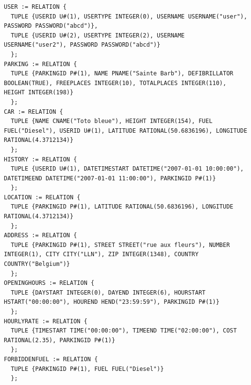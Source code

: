 \documentclass[a4paper,11pt]{article}
\begin{document}
\begin{lstlisting}
USER := RELATION {
  TUPLE {USERID U#(1), USERTYPE INTEGER(0), USERNAME USERNAME("user"), PASSWORD PASSWORD("abcd")},
  TUPLE {USERID U#(2), USERTYPE INTEGER(2), USERNAME USERNAME("user2"), PASSWORD PASSWORD("abcd")}
  };
PARKING := RELATION {
  TUPLE {PARKINGID P#(1), NAME PNAME("Sainte Barb"), DEFIBRILLATOR BOOLEAN(TRUE), FREEPLACES INTEGER(10), TOTALPLACES INTEGER(110), HEIGHT INTEGER(198)}
  };
CAR := RELATION {
  TUPLE {NAME CNAME("Toto bleue"), HEIGHT INTEGER(154), FUEL FUEL("Diesel"), USERID U#(1), LATITUDE RATIONAL(50.6836196), LONGITUDE RATIONAL(4.3712134)}
  };
HISTORY := RELATION {
  TUPLE {USERID U#(1), DATETIMESTART DATETIME("2007-01-01 10:00:00"), DATETIMEEND DATETIME("2007-01-01 11:00:00"), PARKINGID P#(1)}
  };
LOCATION := RELATION {
  TUPLE {PARKINGID P#(1), LATITUDE RATIONAL(50.6836196), LONGITUDE RATIONAL(4.3712134)}
  };
ADDRESS := RELATION {
  TUPLE {PARKINGID P#(1), STREET STREET("rue aux fleurs"), NUMBER INTEGER(1), CITY CITY("LLN"), ZIP INTEGER(1348), COUNTRY COUNTRY("Belgium")}
  };
OPENINGHOURS := RELATION {
  TUPLE {DAYSTART INTEGER(0), DAYEND INTEGER(6), HOURSTART HSTART("00:00:00"), HOUREND HEND("23:59:59"), PARKINGID P#(1)}
  };
HOURLYRATE := RELATION {
  TUPLE {TIMESTART TIME("00:00:00"), TIMEEND TIME("02:00:00"), COST RATIONAL(2.35), PARKINGID P#(1)}
  };
FORBIDDENFUEL := RELATION {
  TUPLE {PARKINGID P#(1), FUEL FUEL("Diesel")}
  };
\end{lstlisting}
\end{document}
